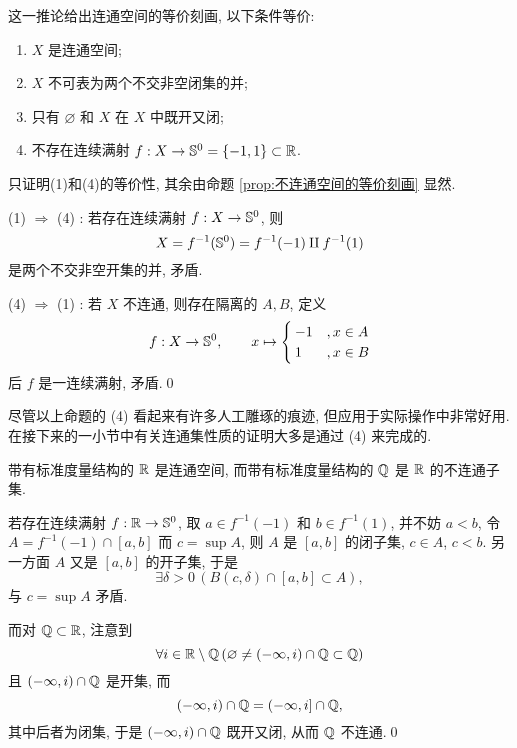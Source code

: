     \begin{Corollary}
        这一推论给出连通空间的等价刻画, 以下条件等价:
        \begin{enumerate}
            \item $ X $ 是连通空间;
            \item $ X $ 不可表为两个不交非空闭集的并;
            \item 只有 $ \varnothing $ 和 $ X $ 在 $ X $ 中既开又闭;
            \item 不存在连续满射 $ f : X\to\S^0=\{-1,1\}\subset\R $.
        \end{enumerate}
    \end{Corollary}
    \begin{Proof}
        只证明(1)和(4)的等价性, 其余由命题 \ref{prop:不连通空间的等价刻画} 显然.

        (1) $ \Rightarrow $ (4) : 若存在连续满射 $ f : X\to\S^0 $, 则
        \[
            X=f^{-1}(\S^0)=f^{-1}(-1)\amalg f^{-1}(1)
        \]
        是两个不交非空开集的并, 矛盾.

        (4) $ \Rightarrow $ (1) : 若 $ X $ 不连通, 则存在隔离的 $ A, B $, 定义
        \[
            f : X\to\S^0,\qquad x\mapsto\begin{cases}
                -1 & ,x\in A\\ 1 & ,x\in B
            \end{cases}
        \]
        后 $ f $ 是一连续满射, 矛盾.\qed
    \end{Proof}

    尽管以上命题的 (4) 看起来有许多人工雕琢的痕迹, 但应用于实际操作中非常好用. 在接下来的一小节中有关连通集性质的证明大多是通过 (4) 来完成的.

    \begin{Example}
        带有标准度量结构的 $ \R $ 是连通空间, 而带有标准度量结构的 $ \Q $ 是 $ \R $ 的不连通子集.
    \end{Example}
    \begin{Proof}
        若存在连续满射 $ f : \R\to\S^0 $, 取 $ a\in f^{-1}(-1) $ 和 $ b\in f^{-1}(1) $, 并不妨 $ a<b $, 令 $ A=f^{-1}(-1)\cap[a,b] $ 而 $ c=\sup A $, 则 $ A $ 是 $ [a,b] $ 的闭子集, $ c\in A $, $ c<b $. 另一方面 $ A $ 又是 $ [a,b] $ 的开子集, 于是
        \[
            \exists\delta>0\,(B(c,\delta)\cap[a,b]\subset A),
        \]
        与 $ c=\sup A $ 矛盾.

        而对 $ \Q\subset\R $, 注意到
        \[
            \forall i\in\R\sm\Q\,(\varnothing\ne(-\infty,i)\cap\Q\subset\Q)
        \]
        且 $ (-\infty,i)\cap\Q $ 是开集, 而
        \[
            (-\infty,i)\cap\Q=(-\infty,i]\cap\Q,
        \]
        其中后者为闭集, 于是 $ (-\infty,i)\cap\Q $ 既开又闭, 从而 $ \Q $ 不连通.\qed
    \end{Proof}

